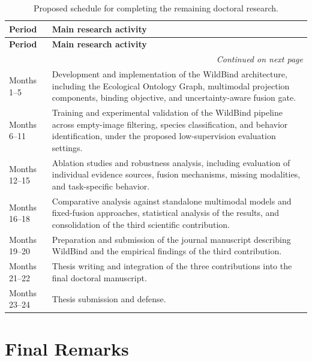 \begin{longtable}{p{2.4cm} p{10.5cm}}
\caption{Proposed schedule for completing the remaining doctoral research.}
\label{tab:project_schedule} \\

\toprule
\textbf{Period} & \textbf{Main research activity} \\
\midrule
\endfirsthead

\toprule
\textbf{Period} & \textbf{Main research activity} \\
\midrule
\endhead

\midrule
\multicolumn{2}{r}{\textit{Continued on next page}} \\
\endfoot

\bottomrule
\endlastfoot

Months 1--5
&
Development and implementation of the WildBind architecture, including the Ecological Ontology Graph, multimodal projection components, binding objective, and uncertainty-aware fusion gate. \\

Months 6--11
&
Training and experimental validation of the WildBind pipeline across empty-image filtering, species classification, and behavior identification, under the proposed low-supervision evaluation settings. \\

Months 12--15
&
Ablation studies and robustness analysis, including evaluation of individual evidence sources, fusion mechanisms, missing modalities, and task-specific behavior. \\

Months 16--18
&
Comparative analysis against standalone multimodal models and fixed-fusion approaches, statistical analysis of the results, and consolidation of the third scientific contribution. \\

Months 19--20
&
Preparation and submission of the journal manuscript describing WildBind and the empirical findings of the third contribution. \\

Months 21--22
&
Thesis writing and integration of the three contributions into the final doctoral manuscript. \\

Months 23--24
&
Thesis submission and defense. \\

\end{longtable}

\section{Final Remarks}\label{sec:final_remarks_project}

